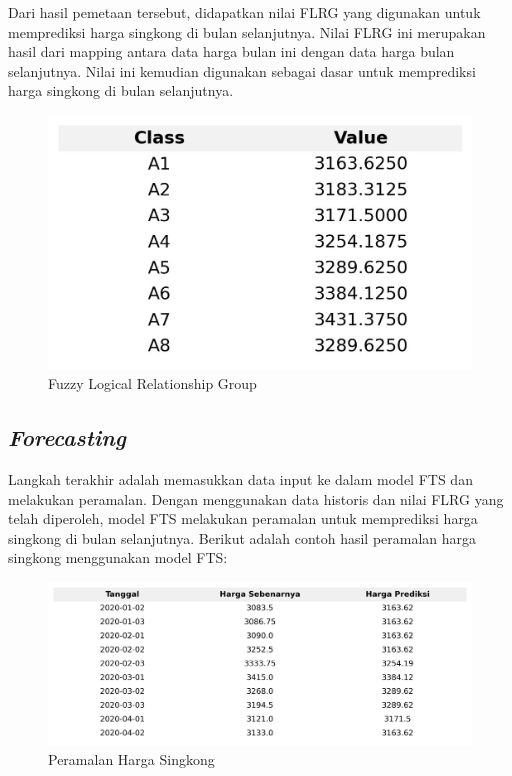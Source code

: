 \documentclass[conference]{IEEEtran}
\begin{document}
Dari hasil pemetaan tersebut, didapatkan nilai FLRG yang digunakan untuk memprediksi harga singkong di bulan selanjutnya. Nilai FLRG ini merupakan hasil dari mapping antara data harga bulan ini dengan data harga bulan selanjutnya. Nilai ini kemudian digunakan sebagai dasar untuk memprediksi harga singkong di bulan selanjutnya.

\begin{figure}[H]
    \centering
    \includegraphics[scale=0.7]{images/flrg_table.jpg} 
    \caption{Fuzzy Logical Relationship Group}
\end{figure}

\subsection{\textit{Forecasting}}
Langkah terakhir adalah memasukkan data input ke dalam model FTS dan melakukan peramalan. Dengan menggunakan data historis dan nilai FLRG yang telah diperoleh, model FTS melakukan peramalan untuk memprediksi harga singkong di bulan selanjutnya. Berikut adalah contoh hasil peramalan harga singkong menggunakan model FTS:
\begin{figure}[H]
    \centering
    \includegraphics[scale=0.55]{images/tabel_perbandingan_harga.jpg} 
    \caption{Peramalan Harga Singkong}
\end{figure}
\end{document}
